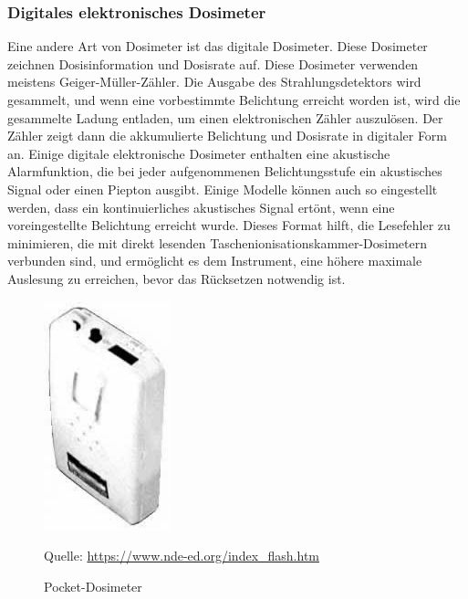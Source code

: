 {\subsubsection{Digitales elektronisches Dosimeter}
Eine andere Art von Dosimeter ist das digitale Dosimeter. Diese Dosimeter zeichnen Dosisinformation und Dosisrate auf. Diese Dosimeter verwenden meistens Geiger-Müller-Zähler. Die Ausgabe des Strahlungsdetektors wird gesammelt, und wenn eine vorbestimmte Belichtung erreicht worden ist, wird die gesammelte Ladung entladen, um einen elektronischen Zähler auszulösen.
Der Zähler zeigt dann die akkumulierte Belichtung und Dosisrate in digitaler Form an.
Einige digitale elektronische Dosimeter enthalten eine akustische Alarmfunktion, die bei jeder aufgenommenen Belichtungsstufe ein akustisches Signal oder einen Piepton ausgibt. Einige Modelle können auch so eingestellt werden, dass ein kontinuierliches akustisches Signal ertönt, wenn eine voreingestellte Belichtung erreicht wurde. Dieses Format hilft, die Lesefehler zu minimieren, die mit direkt lesenden Taschenionisationskammer-Dosimetern verbunden sind, und ermöglicht es dem Instrument, eine höhere maximale Auslesung zu erreichen, bevor das Rücksetzen notwendig ist.
\begin{figure}[htb]
\centering
  \includegraphics[scale=0.3]{img/Digital-Dosimeter.jpg}\\
  \caption{Pocket-Dosimeter}
  \label{fig:Pocket-Dosimeter}
  Quelle: \url{https://www.nde-ed.org/index_flash.htm}
\end{figure}
}
